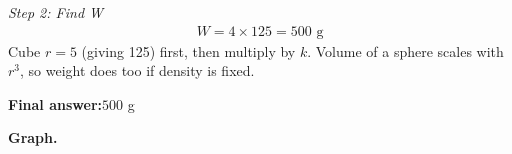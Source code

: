 \documentclass[11pt]{article}
\begin{document}
\textit{Step 2: Find W}
\[\begin{gathered}
W = 4 \times 125 = 500 \text{ g}
\end{gathered}\]
Cube \( r = 5 \) (giving 125) first, then multiply by \( k \). Volume of a sphere scales with \( r^3 \), so weight does too if density is fixed.

\begin{answerbox}
\textbf{Final answer:}\quad \(\displaystyle 500\) g
\end{answerbox}
\textbf{Graph.}

\begin{center}
\end{center}
\end{document}
